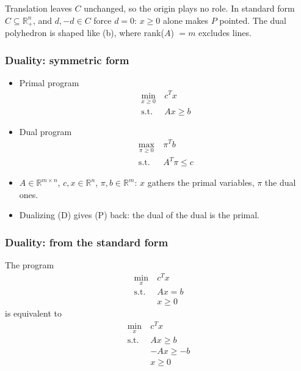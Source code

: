 \documentclass[aspectratio=169]{beamer}
\providecommand{\red}{\color{red}}
\def\RR{\mathbb{R}}
\begin{document}
\begin{frame}
{\footnotesize Translation leaves $C$ unchanged, so the origin plays no role. In standard form $C \subseteq \RR^n_+$, and $d, -d \in C$ force $d = 0$: $x \geq 0$ alone makes $P$ pointed. The dual polyhedron is shaped like (b), where rank($A$) $= m$ excludes lines.}

\end{frame}

\begin{frame}
	\frametitle{Duality: symmetric form}

\begin{itemize}
	\item 
{\red Primal} program
\begin{equation}
	\begin{aligned}
	\min_{x \geq 0} \ & c^T x \\
	\mbox{s.t. } & Ax \geq b
	\end{aligned}
\tag{P}\label{eq:primal}
\end{equation}
\item
{\red Dual} program
\begin{equation}
	\begin{aligned}
	\max_{\pi \geq 0} \ & \pi^T b \\
	\mbox{s.t. } & A^T \pi \leq c
	\end{aligned}
\tag{D}\label{eq:dual}
\end{equation}
\item
$A \in \RR^{m \times n}$, $c, x \in \RR^n$, $\pi, b \in \RR^m$: $x$ gathers the {\red primal} variables, $\pi$ the {\red dual} ones.
\item
Dualizing (D) gives (P) back: the dual of the dual is the primal.
\end{itemize}
\end{frame}

\begin{frame}
	\frametitle{Duality: from the standard form}
	
	The program
	\begin{align*}
		\min_x \ & c^T x \\
		\mbox{s.t. } & Ax = b \\
		& x \geq 0
	\end{align*}
	is equivalent to
	\begin{align*}
		\min_x \ & c^T x \\
		\mbox{s.t. } & Ax \geq b \\
		& -Ax \geq -b \\
		& x \geq 0
	\end{align*}
	
\end{frame}
\end{document}
